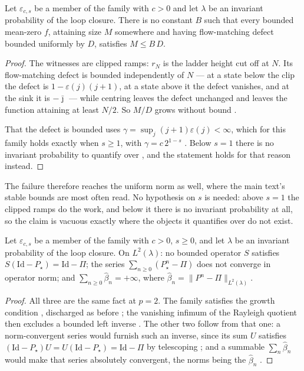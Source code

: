 \begin{theorem}
  \label{thm:main_unbounded_infty}
  \leanok
Let $\varepsilon_{c,s}$ be a member of the family with $c>0$ and let $\lambda$ be an invariant
probability of the loop closure. There is no constant $B$ such that every bounded mean-zero
$f$, attaining size $M$ somewhere and having flow-matching defect bounded uniformly by $D$,
satisfies $M\leq B\,D$.
\end{theorem}

\begin{proof}
  \leanok
The witnesses are clipped ramps: $r_N$ is the ladder height cut off at $N$. Its
flow-matching defect is bounded independently of $N$ — at a state below the clip the defect is
$1-\varepsilon(j)(j+1)$, at a state above it the defect vanishes, and at the sink it is
$-\bar\jmath$ — while centring leaves the defect unchanged and leaves the function attaining at
least $N/2$. So $M/D$ grows without bound
.

That the defect is bounded uses $\gamma=\sup_j(j+1)\varepsilon(j)<\infty$, which for this
family holds exactly when $s\geq1$, with $\gamma=c\,2^{1-s}$
. Below $s=1$ there is no invariant probability to quantify
over , and the statement holds for that
reason instead.
\end{proof}

\noindent The failure therefore reaches the uniform norm as well, where the main text's stable bounds are
most often read. No hypothesis on $s$ is needed: above $s=1$ the clipped ramps do the work, and
below it there is no invariant probability at all, so the claim is vacuous exactly where the
objects it quantifies over do not exist.


\begin{theorem}
  \label{thm:main_unbounded_two}
  \leanok
Let $\varepsilon_{c,s}$ be a member of the family with $c>0$, $s\geq0$, and let $\lambda$ be an
invariant probability of the loop closure. On $L^2(\lambda)$: no bounded operator $S$ satisfies
$S(\mathrm{Id}-P_\star)=\mathrm{Id}-\Pi$; the series $\sum_{n\geq0}(P_\star^n-\Pi)$ does not
converge in operator norm; and $\sum_{n\geq0}\widehat\beta_n=+\infty$, where
$\widehat\beta_n=\|P^n-\Pi\|_{L^2(\lambda)}$.
\end{theorem}

\begin{proof}
  \leanok
All three are the same fact at $p=2$. The family satisfies the growth condition
, discharged as before
; the vanishing infimum of the Rayleigh quotient
then excludes a bounded left inverse . The other two
follow from that one: a norm-convergent series would furnish such an inverse, since its sum
$U$ satisfies $(\mathrm{Id}-P_\star)U=U(\mathrm{Id}-P_\star)=\mathrm{Id}-\Pi$ by telescoping
; and a summable
$\sum_n\widehat\beta_n$ would make that series absolutely convergent, the norms being the
$\widehat\beta_n$ .
\end{proof}


